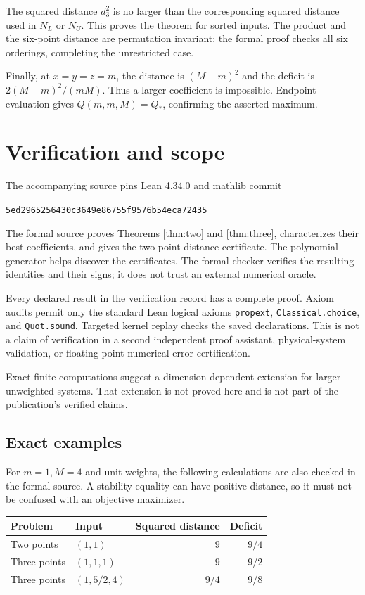 \documentclass[11pt]{article}
\begin{document}
The squared distance $d_3^2$ is no larger than the corresponding squared
distance used in $N_L$ or $N_U$. This proves the theorem for sorted inputs.
The product and the six-point distance are permutation invariant; the
formal proof checks all six orderings, completing the unrestricted case.

Finally, at $x=y=z=m$, the distance is $(M-m)^2$ and the deficit is
$2(M-m)^2/(mM)$. Thus a larger coefficient is impossible. Endpoint
evaluation gives $Q(m,m,M)=Q_*$, confirming the asserted maximum.

\section{Verification and scope}
The accompanying source pins Lean 4.34.0 and mathlib commit
\begin{center}\small\texttt{5ed2965256430c3649e86755f9576b54eca72435}\end{center}
The formal source proves Theorems \ref{thm:two} and \ref{thm:three},
characterizes their best coefficients, and gives the two-point distance
certificate. The polynomial generator helps discover the certificates.
The formal checker verifies the resulting identities and their signs;
it does not trust an external numerical oracle.

Every declared result in the verification record has a complete proof.
Axiom audits permit only the standard Lean logical axioms
\texttt{propext}, \texttt{Classical.choice}, and \texttt{Quot.sound}.
Targeted kernel replay checks the saved declarations. This is not a claim
of verification in a second independent proof assistant, physical-system
validation, or floating-point numerical error certification.

Exact finite computations suggest a dimension-dependent extension for
larger unweighted systems. That extension is not proved here and is not
part of the publication's verified claims.

\subsection{Exact examples}
For $m=1,M=4$ and unit weights, the following calculations are also
checked in the formal source. A stability equality can have positive
distance, so it must not be confused with an objective maximizer.
\begin{center}
\begin{tabular}{@{}llrr@{}}
\toprule
Problem & Input & Squared distance & Deficit\\
\midrule
Two points & $(1,1)$ & $9$ & $9/4$\\
Three points & $(1,1,1)$ & $9$ & $9/2$\\
Three points & $(1,5/2,4)$ & $9/4$ & $9/8$\\
\bottomrule
\end{tabular}
\end{center}
\end{document}
